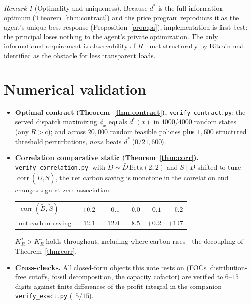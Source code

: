 \documentclass[11pt,reqno]{amsart}
\theoremstyle{plain}
\theoremstyle{definition}
\theoremstyle{remark}
\newtheorem{remark}{Remark}
\newcommand{\KRs}{K_R^{*}}\newcommand{\KFs}{K_F^{*}}\newcommand{\KMs}{K_M^{*}}
\newcommand{\KRo}{K_R^{\circ}}\newcommand{\KFo}{K_F^{\circ}}
\newcommand{\Dbar}{\bar D}
\newcommand{\dstar}{d^{*}}
\begin{document}
\begin{remark}[Optimality and uniqueness]
Because $\dstar$ is the full-information optimum (Theorem~\ref{thm:contract}) and
the price program reproduces it as the agent's unique best response
(Proposition~\ref{prop:pa}), implementation is first-best: the principal loses
nothing to the agent's private optimization. The only informational requirement is
observability of $R$---met structurally by Bitcoin and identified as the obstacle
for less transparent loads.
\end{remark}

\section{Numerical validation}\label{sec:num}

\begin{itemize}[leftmargin=1.6em]
  \item \textbf{Optimal contract (Theorem~\ref{thm:contract}).}
        \texttt{verify\_contract.py}: the served dispatch maximizing
        $\phi_x$ equals $\dstar(x)$ in $4000/4000$ random states (any $R>c$); and
        across $20{,}000$ random feasible policies plus $1{,}600$ structured
        threshold perturbations, \emph{none} beats $\dstar$ ($0/21{,}600$).
  \item \textbf{Correlation comparative static (Theorem~\ref{thm:corr}).}
        \texttt{verify\_correlation.py}: with $\tilde D\sim\Dbar\,\mathrm{Beta}(2,2)$
        and $\tilde S\mid\tilde D$ shifted to tune $\operatorname{corr}(\tilde D,\tilde S)$,
        the net carbon saving is monotone in the correlation and changes sign at
        zero association:
        \begin{center}\small
        \begin{tabular}{lrrrrr}
        \toprule
        $\operatorname{corr}(\tilde D,\tilde S)$ & $+0.2$ & $+0.1$ & $0.0$ & $-0.1$ & $-0.2$\\
        net carbon saving & $-12.1$ & $-12.0$ & $-8.5$ & $+0.2$ & $+107$\\
        \bottomrule
        \end{tabular}
        \end{center}
        $\KRs>\KRo$ holds throughout, including where carbon rises---the
        decoupling of Theorem~\ref{thm:corr}.
  \item \textbf{Cross-checks.} All closed-form objects this note rests on
        (FOCs, distribution-free cutoffs, fossil decomposition, the capacity
        cofactor) are verified to $6$--$16$ digits against finite differences of
        the profit integral in the companion \texttt{verify\_exact.py}
        ($15/15$).
\end{itemize}
\end{document}
